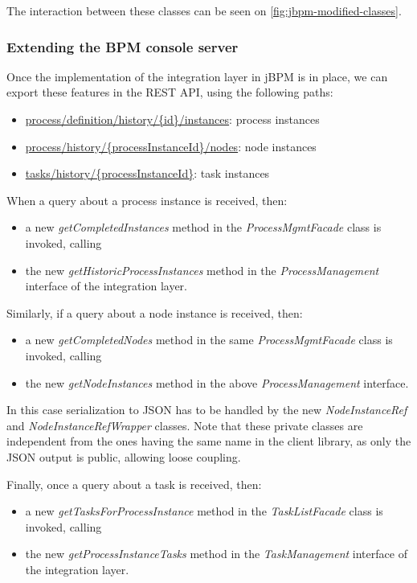 The interaction between these classes can be seen on \autoref{fig:jbpm-modified-classes}.

\subsubsection*{Extending the BPM console server}

Once the implementation of the integration layer in jBPM is in place, we can
export these features in the REST API, using the following paths:

\begin{itemize}
\item \url{process/definition/history/{id}/instances}: process instances
\item \url{process/history/{processInstanceId}/nodes}: node instances
\item \url{tasks/history/{processInstanceId}}: task instances
\end{itemize}

When a query about a process instance is received, then:

\begin{itemize}
\item a new \emph{getCompletedInstances} method in the \emph{ProcessMgmtFacade} class is invoked, calling
\item the new \emph{getHistoricProcessInstances} method in the \emph{ProcessManagement} interface of the integration layer.
\end{itemize}

Similarly, if a query about a node instance is received, then:

\begin{itemize}
\item a new \emph{getCompletedNodes} method in the same \emph{ProcessMgmtFacade} class is invoked, calling
\item the new \emph{getNodeInstances} method in the above \emph{ProcessManagement} interface.
\end{itemize}

In this case serialization to JSON has to be handled by the new
\emph{NodeInstanceRef} and \emph{NodeInstanceRefWrapper} classes. Note that
these private classes are independent from the ones having the same name in the
client library, as only the JSON output is public, allowing loose coupling.

Finally, once a query about a task is received, then:

\begin{itemize}
\item a new \emph{getTasksForProcessInstance} method in the \emph{TaskListFacade} class is invoked, calling
\item the new \emph{getProcessInstanceTasks} method in the \emph{TaskManagement} interface of the integration layer.
\end{itemize}

